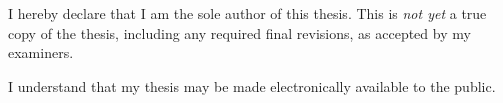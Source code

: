 \chapter*{}

\mbox{}\vfill

\newlength{\oldparskip}
\setlength{\oldparskip}{\parskip}

\begin{center}
\begin{minipage}{0.6\textwidth}
\setlength{\parindent}{\oldparindent}
\setlength{\parskip}{\oldparskip}
I hereby declare that I am the sole author of this thesis.
This is \emph{not yet} a true copy of the thesis, including any required final revisions, as accepted by my examiners.

I understand that my thesis may be made electronically available to the public.
\end{minipage}
\end{center}

\vfill
\vfill
\vfill
